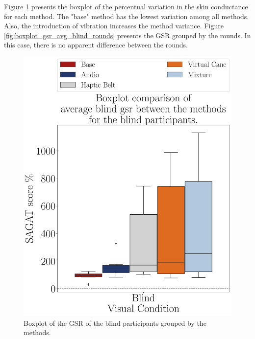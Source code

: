 Figure \ref{fig:boxplot_gsr_avg_blind_scene} presents the boxplot of the percentual variation in the skin conductance for each method. The "base" method has the lowest variation among all methods. Also, the introduction of vibration increases the method variance. Figure \ref{fig:boxplot_gsr_avg_blind_rounds} presents the GSR grouped by the rounds. In this case, there is no apparent difference between the rounds.

\begin{figure}[!htb]
    \centering
    \begin{minipage}{0.45\textwidth}
        \centering
        \includegraphics[width = \textwidth]{Resultados/GSR/Figuras/pdf/boxplot_gsr_avg_blind_scene.pdf}
        \caption{Boxplot of the GSR of the blind participants grouped by the methods.}
        \label{fig:boxplot_gsr_avg_blind_scene}
    \end{minipage}
    \begin{minipage}{0.075\textwidth}
        \hfill
    \end{minipage}
    \begin{minipage}{0.45\textwidth}

\end{minipage}
\end{figure}
